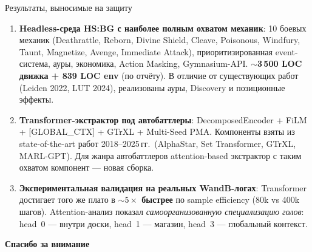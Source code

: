 \documentclass[aspectratio=169,10pt]{beamer}
\begin{document}
\begin{frame}{Результаты, выносимые на защиту}
  \begin{enumerate}
    \item \textbf{Headless-среда HS:BG с наиболее полным охватом механик}: 10 боевых механик (Deathrattle, Reborn, Divine Shield, Cleave, Poisonous, Windfury, Taunt, Magnetize, Avenge, Immediate Attack), приоритизированная event-система, ауры, экономика, Action Masking, Gymnasium-API. \textbf{$\sim$3\,500 LOC движка + 839 LOC env} (по отчёту). В отличие от существующих работ (Leiden 2022, LUT 2024), реализованы ауры, Discovery и позиционные эффекты.

    \vspace{0.3em}
    \item \textbf{Transformer-экстрактор под автобаттлеры}: DecomposedEncoder + FiLM + [GLOBAL\_CTX] + GTrXL + Multi-Seed PMA. Компоненты взяты из state-of-the-art работ 2018--2025\,гг.\ (AlphaStar, Set Transformer, GTrXL, MARL-GPT). Для жанра автобаттлеров attention-based экстрактор с таким охватом компонент --- новая сборка.

    \vspace{0.3em}
    \item \textbf{Экспериментальная валидация на реальных WandB-логах}: Transformer достигает того же плато в \textbf{$\sim 5\times$ быстрее} по sample efficiency (80k vs 400k шагов). Attention-анализ показал \emph{самоорганизованную специализацию голов}: head~0 --- внутри доски, head~1 --- магазин, head~3 --- глобальный контекст.
  \end{enumerate}

  \vspace{0.6em}
  \centering
  \large\textbf{Спасибо за внимание}
\end{frame}
\end{document}
